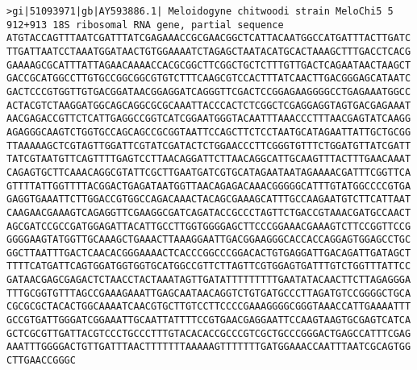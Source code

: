 \documentclass[11pt]{article}
\begin{document}
\begin{Verbatim}[commandchars=\\\{\}]
>gi|51093971|gb|AY593886.1| Meloidogyne chitwoodi strain MeloChi5 5 912+913 18S ribosomal RNA gene, partial sequence
ATGTACCAGTTTAATCGATTTATCGAGAAACCGCGAACGGCTCATTACAATGGCCATGATTTACTTGATC
TTGATTAATCCTAAATGGATAACTGTGGAAAATCTAGAGCTAATACATGCACTAAAGCTTTGACCTCACG
GAAAAGCGCATTTATTAGAACAAAACCACGCGGCTTCGGCTGCTCTTTGTTGACTCAGAATAACTAAGCT
GACCGCATGGCCTTGTGCCGGCGGCGTGTCTTTCAAGCGTCCACTTTATCAACTTGACGGGAGCATAATC
GACTCCCGTGGTTGTGACGGATAACGGAGGATCAGGGTTCGACTCCGGAGAAGGGGCCTGAGAAATGGCC
ACTACGTCTAAGGATGGCAGCAGGCGCGCAAATTACCCACTCTCGGCTCGAGGAGGTAGTGACGAGAAAT
AACGAGACCGTTCTCATTGAGGCCGGTCATCGGAATGGGTACAATTTAAACCCTTTAACGAGTATCAAGG
AGAGGGCAAGTCTGGTGCCAGCAGCCGCGGTAATTCCAGCTTCTCCTAATGCATAGAATTATTGCTGCGG
TTAAAAAGCTCGTAGTTGGATTCGTATCGATACTCTGGAACCCTTCGGGTGTTTCTGGATGTTATCGATT
TATCGTAATGTTCAGTTTTGAGTCCTTAACAGGATTCTTAACAGGCATTGCAAGTTTACTTTGAACAAAT
CAGAGTGCTTCAAACAGGCGTATTCGCTTGAATGATCGTGCATAGAATAATAGAAAACGATTTCGGTTCA
GTTTTATTGGTTTTACGGACTGAGATAATGGTTAACAGAGACAAACGGGGGCATTTGTATGGCCCCGTGA
GAGGTGAAATTCTTGGACCGTGGCCAGACAAACTACAGCGAAAGCATTTGCCAAGAATGTCTTCATTAAT
CAAGAACGAAAGTCAGAGGTTCGAAGGCGATCAGATACCGCCCTAGTTCTGACCGTAAACGATGCCAACT
AGCGATCCGCCGATGGAGATTACATTGCCTTGGTGGGGAGCTTCCCGGAAACGAAAGTCTTCCGGTTCCG
GGGGAAGTATGGTTGCAAAGCTGAAACTTAAAGGAATTGACGGAAGGGCACCACCAGGAGTGGAGCCTGC
GGCTTAATTTGACTCAACACGGGAAAACTCACCCGGCCCGGACACTGTGAGGATTGACAGATTGATAGCT
TTTTCATGATTCAGTGGATGGTGGTGCATGGCCGTTCTTAGTTCGTGGAGTGATTTGTCTGGTTTATTCC
GATAACGAGCGAGACTCTAACCTACTAAATAGTTGATATTTTTTTTTGAATATACAACTTCTTAGAGGGA
TTTGCGGTGTTTAGCCGAAAGAAATTGAGCAATAACAGGTCTGTGATGCCCTTAGATGTCCGGGGCTGCA
CGCGCGCTACACTGGCAAAATCAACGTGCTTGTCCTTCCCCGAAAGGGGCGGGTAAACCATTGAAAATTT
GCCGTGATTGGGATCGGAAATTGCAATTATTTTCCGTGAACGAGGAATTCCAAGTAAGTGCGAGTCATCA
GCTCGCGTTGATTACGTCCCTGCCCTTTGTACACACCGCCCGTCGCTGCCCGGGACTGAGCCATTTCGAG
AAATTTGGGGACTGTTGATTTAACTTTTTTTAAAAAGTTTTTTTGATGGAAACCAATTTAATCGCAGTGG
CTTGAACCGGGC


\end{Verbatim}
\end{document}
